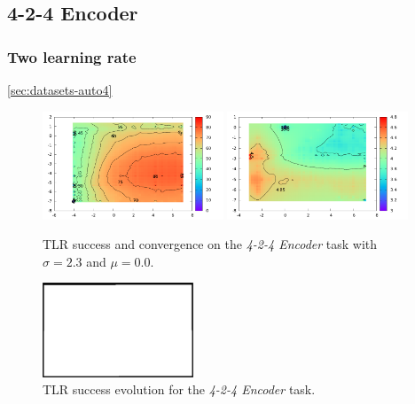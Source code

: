 \subsection{4-2-4 Encoder} 

\subsubsection{Two learning rate} 
\label{sec:tlr-auto4} 
\ref{sec:datasets-auto4} 
\begin{figure}[H]
  \centering
  \includegraphics[width=0.48\textwidth]{img/tlr-auto4-success.pdf}   
  \includegraphics[width=0.48\textwidth]{img/tlr-auto4-epoch.pdf}     
  \caption{TLR success and convergence on the \emph{4-2-4 Encoder} task with $\sigma = 2.3$ and $\mu = 0.0$.}
  \label{fig:results-tlr-auto4-performance}
\end{figure}

\begin{figure}[H]
  \centering
  \includegraphics[width=0.4\textwidth]{img/placeholder.png}  %
  \caption{TLR success evolution for the \emph{4-2-4 Encoder} task.}
  \label{fig:results-tlr-auto4-epoch} 
\end{figure}

